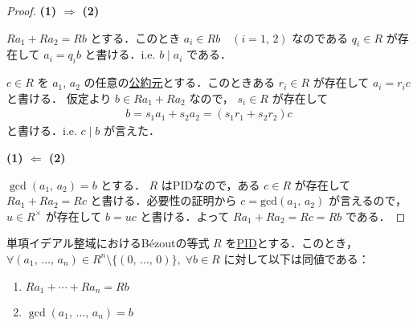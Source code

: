 \documentclass[rep_main]{subfiles}
\begin{document}
\begin{proof}
    \item[\textbf{(1) $\bm{\Longrightarrow}$ (2)}]　
    
    $Ra_1 + Ra_2 = Rb$ とする．このとき $a_i \in Rb\quad (i = 1,\, 2)$ なのである $q_i \in R$ が存在して $a_i = q_i b$ と書ける．i.e. $b \mid a_i$ である．
    
    $c \in R$ を $a_1,\, a_2$ の任意の\hyperref[def:domain-basic]{公約元}とする．このときある $r_i \in R$ が存在して $a_i = r_i c$ と書ける．
    仮定より $b \in Ra_1 + Ra_2$ なので，
    $s_i \in R$ が存在して
    \begin{align}
        b = s_1a_1 + s_2a_2 = (s_1 r_1 + s_2r_2) c
    \end{align}
    と書ける．i.e. $c \mid b$ が言えた．
    \item[\textbf{(1) $\bm{\Longleftarrow}$ (2)}]　
    
    $\mathrm{\gcd}(a_1,\, a_2) = b$ とする．
    $R$ はPIDなので，ある $c \in R$ が存在して $Ra_1 + Ra_2 = Rc$ と書ける．必要性の証明から $c = \mathrm{gcd}(a_1,\, a_2)$ が言えるので，$u \in R^\times$ が存在して $b = uc$ と書ける．よって $Ra_1 + Ra_2 = Rc = Rb$ である．
\end{proof}

\begin{mycol}[label=col:PID-Bezout]{単項イデアル整域におけるB\'{e}zoutの等式}
    $R$ を\hyperref[def:domains]{PID}とする．このとき，$\forall (a_1,\, \dots,\, a_n) \in R^n \setminus \{(0,\, \dots,\, 0)\},\; \forall b \in R$ に対して以下は同値である：
    \begin{enumerate}
        \item $Ra_1 + \cdots + Ra_n = Rb$
        \item $\mathrm{\gcd}(a_1,\, \dots,\, a_n) = b$
    \end{enumerate}
\end{mycol}
\end{document}
